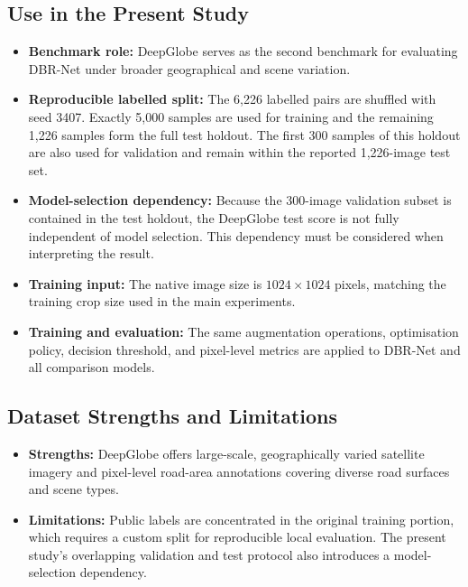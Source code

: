 \documentclass[11pt,a4paper]{article}
\begin{document}
\subsection{Use in the Present Study}

\begin{itemize}
  \item \textbf{Benchmark role:} DeepGlobe serves as the second benchmark for
        evaluating DBR-Net under broader geographical and scene variation.
  \item \textbf{Reproducible labelled split:} The 6,226 labelled pairs are
        shuffled with seed 3407. Exactly 5,000 samples are used for training and
        the remaining 1,226 samples form the full test holdout. The first 300
        samples of this holdout are also used for validation and remain within
        the reported 1,226-image test set.
  \item \textbf{Model-selection dependency:} Because the 300-image validation
        subset is contained in the test holdout, the DeepGlobe test score is not
        fully independent of model selection. This dependency must be considered
        when interpreting the result.
  \item \textbf{Training input:} The native image size is
        $1024\times1024$ pixels, matching the training crop size used in the main
        experiments.
  \item \textbf{Training and evaluation:} The same augmentation operations,
        optimisation policy, decision threshold, and pixel-level metrics are
        applied to DBR-Net and all comparison models.
\end{itemize}

\subsection{Dataset Strengths and Limitations}

\begin{itemize}
  \item \textbf{Strengths:} DeepGlobe offers large-scale, geographically varied
        satellite imagery and pixel-level road-area annotations covering diverse
        road surfaces and scene types.
  \item \textbf{Limitations:} Public labels are concentrated in the original
        training portion, which requires a custom split for reproducible local
        evaluation. The present study's overlapping validation and test protocol
        also introduces a model-selection dependency.
\end{itemize}
\end{document}
